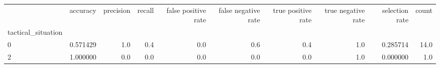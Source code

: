 \begin{tabular}{lrrrrrrrrr}
\toprule
{} &  accuracy &  precision &  recall &  false positive rate &  false negative rate &  true positive rate &  true negative rate &  selection rate &  count \\
tactical\_situation &           &            &         &                      &                      &                     &                     &                 &        \\
\midrule
0                  &  0.571429 &        1.0 &     0.4 &                  0.0 &                  0.6 &                 0.4 &                 1.0 &        0.285714 &   14.0 \\
2                  &  1.000000 &        0.0 &     0.0 &                  0.0 &                  0.0 &                 0.0 &                 1.0 &        0.000000 &    1.0 \\
\bottomrule
\end{tabular}
